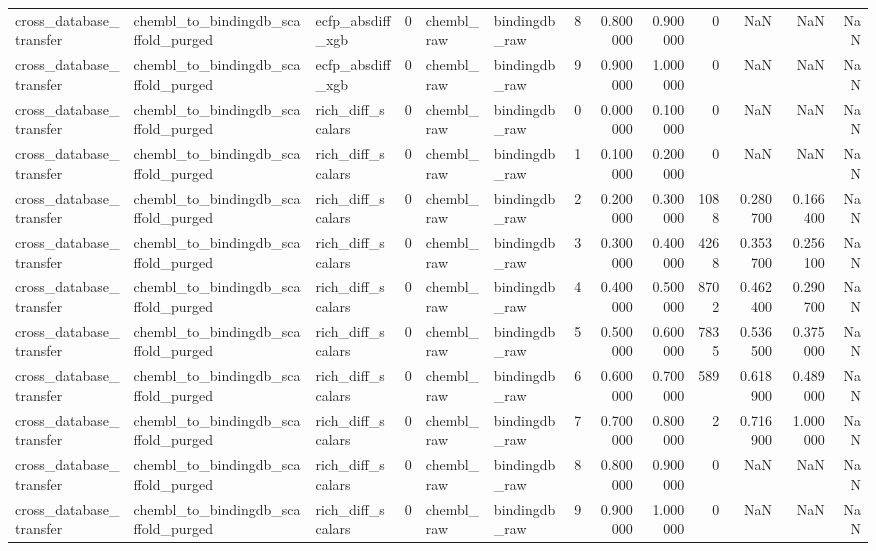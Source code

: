 \begin{longtable}{lllrllrrrrrrr}
cross\_database\_transfer & chembl\_to\_bindingdb\_scaffold\_purged & ecfp\_absdiff\_xgb & 0 & chembl\_raw & bindingdb\_raw & 8 & 0.800000 & 0.900000 & 0 & NaN & NaN & NaN \\
cross\_database\_transfer & chembl\_to\_bindingdb\_scaffold\_purged & ecfp\_absdiff\_xgb & 0 & chembl\_raw & bindingdb\_raw & 9 & 0.900000 & 1.000000 & 0 & NaN & NaN & NaN \\
cross\_database\_transfer & chembl\_to\_bindingdb\_scaffold\_purged & rich\_diff\_scalars & 0 & chembl\_raw & bindingdb\_raw & 0 & 0.000000 & 0.100000 & 0 & NaN & NaN & NaN \\
cross\_database\_transfer & chembl\_to\_bindingdb\_scaffold\_purged & rich\_diff\_scalars & 0 & chembl\_raw & bindingdb\_raw & 1 & 0.100000 & 0.200000 & 0 & NaN & NaN & NaN \\
cross\_database\_transfer & chembl\_to\_bindingdb\_scaffold\_purged & rich\_diff\_scalars & 0 & chembl\_raw & bindingdb\_raw & 2 & 0.200000 & 0.300000 & 1088 & 0.280700 & 0.166400 & NaN \\
cross\_database\_transfer & chembl\_to\_bindingdb\_scaffold\_purged & rich\_diff\_scalars & 0 & chembl\_raw & bindingdb\_raw & 3 & 0.300000 & 0.400000 & 4268 & 0.353700 & 0.256100 & NaN \\
cross\_database\_transfer & chembl\_to\_bindingdb\_scaffold\_purged & rich\_diff\_scalars & 0 & chembl\_raw & bindingdb\_raw & 4 & 0.400000 & 0.500000 & 8702 & 0.462400 & 0.290700 & NaN \\
cross\_database\_transfer & chembl\_to\_bindingdb\_scaffold\_purged & rich\_diff\_scalars & 0 & chembl\_raw & bindingdb\_raw & 5 & 0.500000 & 0.600000 & 7835 & 0.536500 & 0.375000 & NaN \\
cross\_database\_transfer & chembl\_to\_bindingdb\_scaffold\_purged & rich\_diff\_scalars & 0 & chembl\_raw & bindingdb\_raw & 6 & 0.600000 & 0.700000 & 589 & 0.618900 & 0.489000 & NaN \\
cross\_database\_transfer & chembl\_to\_bindingdb\_scaffold\_purged & rich\_diff\_scalars & 0 & chembl\_raw & bindingdb\_raw & 7 & 0.700000 & 0.800000 & 2 & 0.716900 & 1.000000 & NaN \\
cross\_database\_transfer & chembl\_to\_bindingdb\_scaffold\_purged & rich\_diff\_scalars & 0 & chembl\_raw & bindingdb\_raw & 8 & 0.800000 & 0.900000 & 0 & NaN & NaN & NaN \\
cross\_database\_transfer & chembl\_to\_bindingdb\_scaffold\_purged & rich\_diff\_scalars & 0 & chembl\_raw & bindingdb\_raw & 9 & 0.900000 & 1.000000 & 0 & NaN & NaN & NaN \\

\end{longtable}
